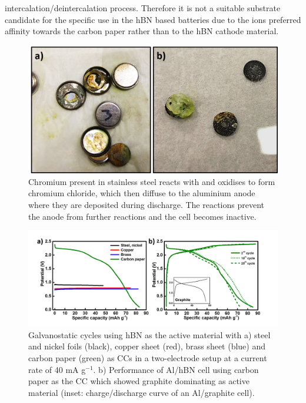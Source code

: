 intercalation/deintercalation process. Therefore it is not a suitable substrate candidate for the specific use in the hBN based batteries due to the ions preferred affinity towards the carbon paper rather than to the hBN cathode material.
\begin{figure}[tbh!]
\centering
\includegraphics[width=\textwidth]{Figures/chap7fig/steeleffect}
\caption{Chromium present in stainless steel reacts with  and oxidises to form chromium chloride, which then diffuse to the aluminium anode where they are deposited during discharge. The reactions prevent the anode from further reactions and the cell becomes inactive.}
\label{Figures/chap7fig:steeleffect}
\end{figure}
\begin{figure}[tbh!]
\centering
\includegraphics[width=\textwidth]{Figures/chap7fig/hBNCCCDC}
\caption{Galvanostatic cycles using hBN as the active material with a) steel and nickel foils (black), copper sheet (red), brass sheet (blue) and carbon paper (green) as CCs in a two-electrode setup at a current rate of 40 mA g$^{-1}$. b) Performance of Al/hBN cell using carbon paper as the CC which showed graphite dominating as active material (inset: charge/discharge curve of an Al/graphite cell).}
\label{Figures/chap7fig:hBNCCCDC}
\end{figure}

